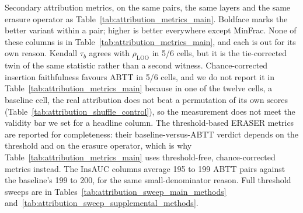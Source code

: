 \begin{table}[t]
\caption{Secondary attribution metrics, on the same pairs, the same layers and the same erasure operator as Table~\ref{tab:attribution_metrics_main}. Boldface marks the better variant within a pair; higher is better everywhere except MinFrac. None of these columns is in Table~\ref{tab:attribution_metrics_main}, and each is out for its own reason. Kendall $\tau_b$ agrees with $\rho_{\text{LOO}}$ in 5/6 cells, but it is the tie-corrected twin of the same statistic rather than a second witness. Chance-corrected insertion faithfulness favours ABTT in 5/6 cells, and we do not report it in Table~\ref{tab:attribution_metrics_main} because in one of the twelve cells, a baseline cell, the real attribution does not beat a permutation of its own scores (Table~\ref{tab:attribution_shuffle_control}), so the measurement does not meet the validity bar we set for a headline column. The threshold-based ERASER metrics are reported for completeness: their baseline-versus-ABTT verdict depends on the threshold and on the erasure operator, which is why Table~\ref{tab:attribution_metrics_main} uses threshold-free, chance-corrected metrics instead. The InsAUC columns average 195 to 199 ABTT pairs against the baseline's 199 to 200, for the same small-denominator reason. Full threshold sweeps are in Tables~\ref{tab:attribution_sweep_main_methods} and~\ref{tab:attribution_sweep_supplemental_methods}.}
\label{tab:attribution_metrics_secondary}
\end{table}
